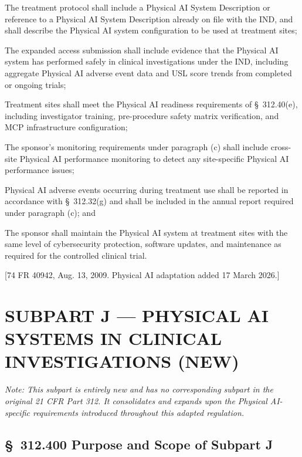 \begin{description}[leftmargin=0.8cm,style=sameline]
\item[(i)] The treatment protocol shall include a Physical AI System Description or reference to a Physical AI System Description already on file with the IND, and shall describe the Physical AI system configuration to be used at treatment sites;
\item[(ii)] The expanded access submission shall include evidence that the Physical AI system has performed safely in clinical investigations under the IND, including aggregate Physical AI adverse event data and USL score trends from completed or ongoing trials;
\item[(iii)] Treatment sites shall meet the Physical AI readiness requirements of \S~312.40(e), including investigator training, pre-procedure safety matrix verification, and MCP infrastructure configuration;
\item[(iv)] The sponsor's monitoring requirements under paragraph (c) shall include cross-site Physical AI performance monitoring to detect any site-specific Physical AI performance issues;
\item[(v)] Physical AI adverse events occurring during treatment use shall be reported in accordance with \S~312.32(g) and shall be included in the annual report required under paragraph (c); and
\item[(vi)] The sponsor shall maintain the Physical AI system at treatment sites with the same level of cybersecurity protection, software updates, and maintenance as required for the controlled clinical trial.
\end{description}

[74 FR 40942, Aug. 13, 2009. Physical AI adaptation added 17 March 2026.]

\clearpage

\section{SUBPART J --- PHYSICAL AI SYSTEMS IN CLINICAL INVESTIGATIONS (NEW)}

\textit{Note: This subpart is entirely new and has no corresponding subpart in the original 21 CFR Part 312. It consolidates and expands upon the Physical AI-specific requirements introduced throughout this adapted regulation.}

\subsection{\S~312.400 Purpose and Scope of Subpart J}

